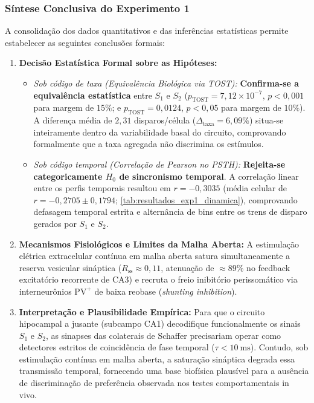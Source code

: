 \documentclass[11pt,a4paper,article,brazil]{abntex2}
\begin{document}
\subsubsection{Síntese Conclusiva do Experimento 1}
A consolidação dos dados quantitativos e das inferências estatísticas permite estabelecer as seguintes conclusões formais:
\begin{enumerate}
    \item \textbf{Decisão Estatística Formal sobre as Hipóteses:}
          \begin{itemize}
              \item \emph{Sob código de taxa (Equivalência Biológica via TOST):} \textbf{Confirma-se a equivalência estatística} entre $S_1$ e $S_2$ ($p_{\text{TOST}} = 7{,}12 \times 10^{-7}$, $p < 0{,}001$ para margem de $15\%$; e $p_{\text{TOST}} = 0{,}0124$, $p < 0{,}05$ para margem de $10\%$). A diferença média de $2{,}31$ disparos/célula ($\Delta_{\text{taxa}} = 6{,}09\%$) situa-se inteiramente dentro da variabilidade basal do circuito, comprovando formalmente que a taxa agregada não discrimina os estímulos.
              \item \emph{Sob código temporal (Correlação de Pearson no PSTH):} \textbf{Rejeita-se categoricamente $H_0$ de sincronismo temporal}. A correlação linear entre os perfis temporais resultou em $r = -0{,}3035$ (média celular de $r = -0{,}2705 \pm 0{,}1794$; \cref{tab:resultados_exp1_dinamica}), comprovando defasagem temporal estrita e alternância de bins entre os trens de disparo gerados por $S_1$ e $S_2$.
          \end{itemize}
    \item \textbf{Mecanismos Fisiológicos e Limites da Malha Aberta:} A estimulação elétrica extracelular contínua em malha aberta satura simultaneamente a reserva vesicular sináptica ($R_{\text{ss}} \approx 0{,}11$, atenuação de $\approx 89\%$ no feedback excitatório recorrente de CA3) e recruta o freio inibitório perissomático via interneurônios $\text{PV}^+$ de baixa reobase (\emph{shunting inhibition}).
    \item \textbf{Interpretação e Plausibilidade Empírica:} Para que o circuito hipocampal a jusante (subcampo CA1) decodifique funcionalmente os sinais $S_1$ e $S_2$, as sinapses das colaterais de Schaffer precisariam operar como detectores estritos de coincidência de fase temporal ($\tau < \qty{10}{\milli\second}$). Contudo, sob estimulação contínua em malha aberta, a saturação sináptica degrada essa transmissão temporal, fornecendo uma base biofísica plausível para a ausência de discriminação de preferência observada nos testes comportamentais in vivo.
\end{enumerate}
\end{document}
